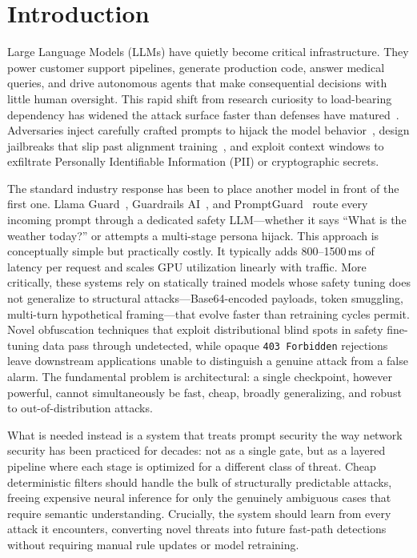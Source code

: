 \documentclass[conference]{IEEEtran}
\begin{document}
\section{Introduction}

Large Language Models (LLMs) have quietly become critical infrastructure.
They power customer support pipelines, generate production code,
answer medical queries, and drive autonomous agents that make
consequential decisions with little human oversight. This rapid
shift from research curiosity to load-bearing dependency has
widened the attack surface faster than defenses have
matured~\cite{surveyprompt,owasptop10}. Adversaries inject
carefully crafted prompts to hijack the model
behavior~\cite{greshake2023indirect}, design jailbreaks that slip
past alignment training~\cite{autodan,pair,wei2023jailbroken,zou2023universal},
and exploit context windows to exfiltrate Personally Identifiable Information (PII) or cryptographic
secrets.

The standard industry response has been to place another model in
front of the first one. Llama Guard~\cite{llamaguard}, Guardrails
AI~\cite{guardrailsai}, and PromptGuard~\cite{promptguard} route
every incoming prompt through a dedicated safety LLM---whether it
says ``What is the weather today?'' or attempts a multi-stage persona
hijack. This approach is conceptually simple but practically
costly. It typically adds 800--1500\,ms of latency per request and
scales GPU utilization linearly with traffic. More critically, these
systems rely on statically trained models whose safety tuning does
not generalize to structural attacks---Base64-encoded payloads,
token smuggling, multi-turn hypothetical framing---that evolve faster
than retraining cycles permit. Novel obfuscation techniques that
exploit distributional blind spots in safety fine-tuning data pass
through undetected, while opaque \texttt{403 Forbidden} rejections
leave downstream applications unable to distinguish a genuine attack
from a false alarm. The fundamental problem is architectural: a
single checkpoint, however powerful, cannot simultaneously be fast,
cheap, broadly generalizing, and robust to out-of-distribution
attacks.

What is needed instead is a system that treats prompt security the
way network security has been practiced for decades: not as a single
gate, but as a layered pipeline where each stage is optimized for a
different class of threat. Cheap deterministic filters should handle
the bulk of structurally predictable attacks, freeing expensive
neural inference for only the genuinely ambiguous cases that
require semantic understanding. Crucially, the system should learn
from every attack it encounters, converting novel threats into future
fast-path detections without requiring manual rule updates or model
retraining.
\end{document}
